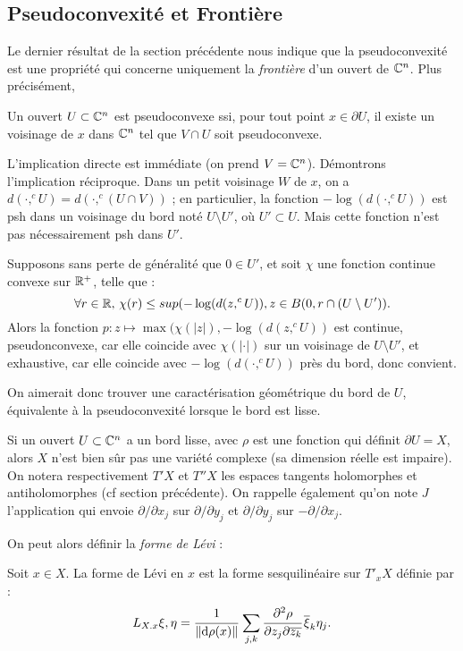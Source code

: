 \subsection{Pseudoconvexité et Frontière}
Le dernier résultat de la section précédente nous indique que la pseudoconvexité est une propriété qui concerne uniquement la \emph{frontière} d'un ouvert de $\mathbb{C}^n$. Plus précisément,

\begin{prop}
	Un ouvert $U \subset \mathbb{C}^n$ est pseudoconvexe ssi, pour tout point $x\in \partial U$, il existe un voisinage de $x$ dans $\mathbb{C}^n$ tel que $V \cap U$ soit pseudoconvexe.
\end{prop}
\begin{preuve}
	L'implication directe est immédiate (on prend $V=\mathbb{C}^n$). Démontrons l'implication réciproque. Dans un petit voisinage $W$ de $x$, on a $d(\cdot,^cU)=d(\cdot,^c(U\cap V))$ ; en particulier, la fonction $-\log(d(\cdot,^cU))$ est psh dans un voisinage du bord noté $U \setminus U'$, où $U' \subset U$. Mais cette fonction n'est pas nécessairement psh dans $U'$.
	
	Supposons sans perte de généralité que $0 \in U'$, et soit $\chi$ une fonction continue convexe sur $\mathbb{R}^+$, telle que :
	\begin{equation*}
		\forall r \in \mathbb{R},\,\chi(r)\leq sup(-\log(d(z,^cU)), z\in B(0,r \cap (U \setminus U')).
	\end{equation*}
	Alors la fonction $p:z \mapsto \max(\chi(|z|),-\log(d(z,^cU))$ est continue, pseudonconvexe, car elle coincide avec $\chi(|\cdot|)$ sur un voisinage de $U\setminus U'$, et exhaustive, car elle coincide avec $-\log(d(\cdot, ^cU))$ près du bord, donc convient.
\end{preuve}

On aimerait donc trouver une caractérisation géométrique du bord de $U$, équivalente à la pseudoconvexité lorsque le bord est lisse.

Si un ouvert $U \subset \mathbb{C}^n$ a un bord lisse, avec $\rho$ est une fonction qui définit $\partial U=X$, alors $X$ n'est bien sûr pas une variété complexe (sa dimension réelle est impaire). On notera respectivement $T'X$ et $T''X$ les espaces tangents holomorphes et antiholomorphes (cf section précédente). On rappelle également qu'on note $J$ l'application qui envoie $\partial/\partial x_j$ sur $\partial/\partial y_j$ et $\partial/\partial y_j$ sur $-\partial/\partial x_j$.

On peut alors définir la \emph{forme de Lévi} :
\begin{defn}
	Soit $x\in X$. La forme de Lévi en $x$ est la forme sesquilinéaire sur $T'_xX$ définie par :
	\begin{equation*}
		L_{X.x}{\xi,\eta}=\cfrac{1}{\|\mathrm{d} \rho(x)\|}\,\sum_{j,k}\cfrac{\partial^2\rho}{\partial z_j\partial \overline{z_k}}\,\overline{\xi}_k\eta_j.
	\end{equation*}
\end{defn}

